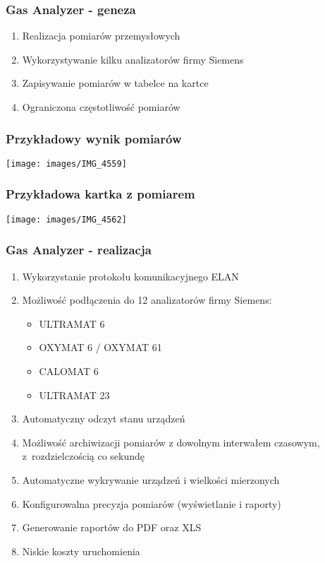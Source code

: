 \documentclass[ucs]{beamer}
\begin{document}
\begin{frame}
\frametitle{Gas Analyzer - geneza}
\begin{enumerate}
\setlength{\itemsep}{5pt}
\setlength{\parskip}{5pt}
\setlength{\parsep}{5pt}
\item Realizacja pomiarów przemysłowych
\item Wykorzystywanie kilku analizatorów firmy Siemens
\item Zapisywanie pomiarów w tabelce na kartce
\item Ograniczona częstotliwość pomiarów
\end{enumerate}
\end{frame}

\begin{frame}
\frametitle{Przykładowy wynik pomiarów}
\begin{center}
\texttt{[image: images/IMG\_4559]}
\end{center}
\end{frame}

\begin{frame}
\frametitle{Przykładowa kartka z pomiarem}
\begin{center}
\texttt{[image: images/IMG\_4562]}
\end{center}
\end{frame}

\begin{frame}
\frametitle{Gas Analyzer - realizacja}
\begin{enumerate}
\item Wykorzystanie protokołu komunikacyjnego ELAN
\item Możliwość podłączenia do 12 analizatorów firmy Siemens:
\begin{itemize}
\item ULTRAMAT 6
\item OXYMAT 6 / OXYMAT 61
\item CALOMAT 6
\item ULTRAMAT 23
\end{itemize}
\item Automatyczny odczyt stanu urządzeń
\item Możliwość archiwizacji pomiarów z dowolnym interwałem czasowym, z~rozdzielczością co sekundę
\item Automatyczne wykrywanie urządzeń i wielkości mierzonych
\item Konfigurowalna precyzja pomiarów (wyświetlanie i raporty)
\item Generowanie raportów do PDF oraz XLS
\item Niskie koszty uruchomienia
\end{enumerate}
\end{frame}
\end{document}
